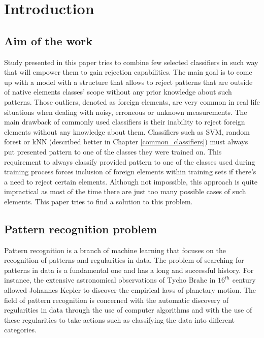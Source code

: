 \chapter{Introduction}

\section{Aim of the work}

Study presented in this paper tries to combine few selected classifiers in such way that will empower them to gain rejection capabilities. The main goal is to come up with a model with a structure that allows to reject patterns that are outside of native elements classes' scope without any prior knowledge about such patterns. Those outliers, denoted as foreign elements, are very common in real life situations when dealing with noisy, erroneous or unknown measurements. The main drawback of commonly used classifiers is their inability to reject foreign elements without any knowledge about them. Classifiers such as SVM, random forest or kNN (described better in Chapter \ref{common_classifiers}) must always put presented pattern to one of the classes they were trained on. This  requirement to always classify provided pattern to one of the classes used during training process forces inclusion of foreign elements within training sets if there's a need to reject certain elements. Although not impossible, this approach is quite impractical as most of the time there are just too many possible cases of such elements. This paper tries to find a solution to this problem. \\

\section{Pattern recognition problem}

Pattern recognition is a branch of machine learning that focuses on the recognition of patterns and regularities in data. The problem of searching for patterns in data is a fundamental one and has a long and successful history. For instance, the extensive astronomical observations of Tycho Brahe in $16^{th}$ century allowed Johannes Kepler to discover the empirical laws of planetary motion. The field of pattern recognition is concerned with the automatic discovery of regularities in data through the use of computer algorithms and with the use of these regularities to take actions such as classifying the data into different categories.\cite{Bishop2006} \\

